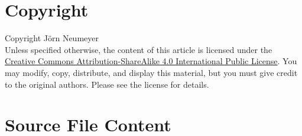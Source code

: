 \documentclass{article}
\begin{document}
  \section{Copyright}
  Copyright \textcopyright {} J\"orn Neumeyer\\
  Unless specified otherwise, the content of this article is licensed under the \href{https://creativecommons.org/licenses/by-sa/4.0/}{Creative Commons Attribution-ShareAlike 4.0 International Public License}.
  You may modify, copy, distribute, and display this material, but you must give credit to the original authors. Please see the license for details.
  \newpage
  \section{Source File Content}
  
  
  
  
  \newpage
  
\end{document}
